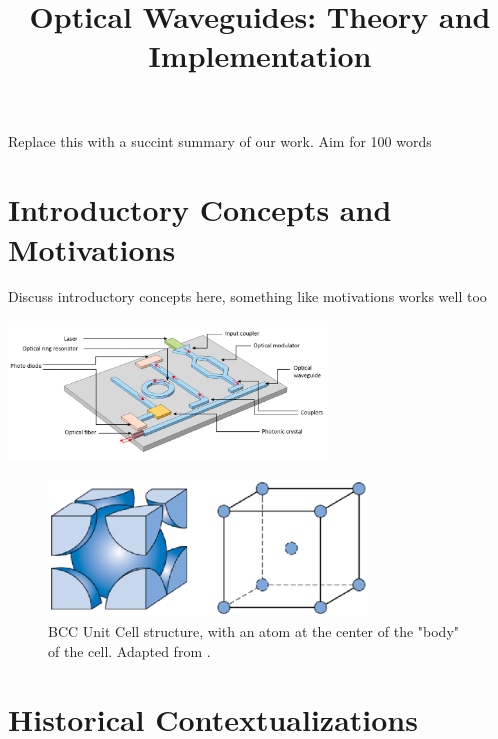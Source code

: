\documentclass[10pt]{article}
\begin{document}
\noindent



\title{Optical Waveguides: Theory and Implementation}




\maketitle


\abstract
Replace this with a succint summary of our work. Aim for 100 words  

\section{Introductory Concepts and Motivations}

Discuss introductory concepts here, something like motivations works well too

\includegraphics[width=8.5cm]{Silicon Photonic.png}


\begin{figure}[h]
    \centering
    \includegraphics[width=8.5cm]{fig1.eps}
    \caption{\label{tab1}BCC Unit Cell structure, with an atom at the center of the "body" of the cell. Adapted from \cite{ref01}.} 
    \end{figure}

\section{Historical Contextualizations}
\end{document}
